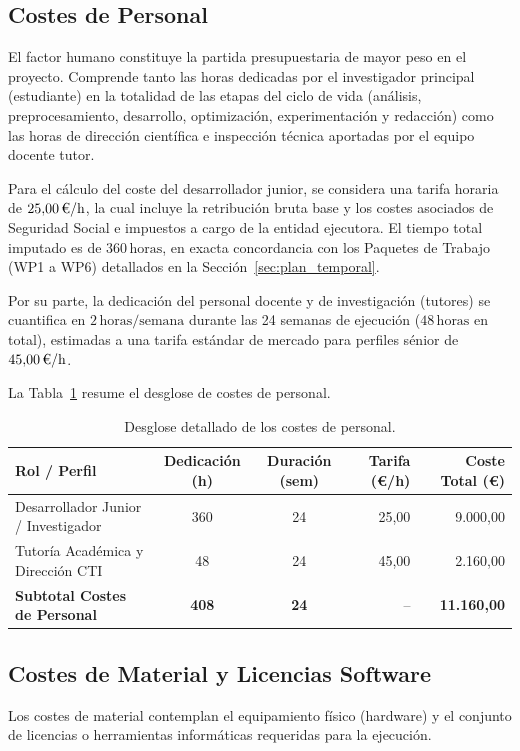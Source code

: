 \subsection{Costes de Personal}
El factor humano constituye la partida presupuestaria de mayor peso en el proyecto. Comprende tanto las horas dedicadas por el investigador principal (estudiante) en la totalidad de las etapas del ciclo de vida (análisis, preprocesamiento, desarrollo, optimización, experimentación y redacción) como las horas de dirección científica e inspección técnica aportadas por el equipo docente tutor.

Para el cálculo del coste del desarrollador junior, se considera una tarifa horaria de $25{,}00\,\text{\euro}/\text{h}$, la cual incluye la retribución bruta base y los costes asociados de Seguridad Social e impuestos a cargo de la entidad ejecutora. El tiempo total imputado es de $360\,\text{horas}$, en exacta concordancia con los Paquetes de Trabajo (WP1 a WP6) detallados en la Sección~\ref{sec:plan_temporal}.

Por su parte, la dedicación del personal docente y de investigación (tutores) se cuantifica en $2\,\text{horas/semana}$ durante las 24 semanas de ejecución ($48\,\text{horas}$ en total), estimadas a una tarifa estándar de mercado para perfiles sénior de $45{,}00\,\text{\euro}/\text{h}$.

La Tabla~\ref{tab:costes_personal} resume el desglose de costes de personal.

\begin{table}[htbp]
\centering
\caption{Desglose detallado de los costes de personal.}
\label{tab:costes_personal}
\small
\begin{tabularx}{\linewidth}{@{}Xccrr@{}}
\toprule
\textbf{Rol / Perfil} & \textbf{Dedicación (h)} & \textbf{Duración (sem)} & \textbf{Tarifa (\euro/h)} & \textbf{Coste Total (\euro)} \\
\midrule
Desarrollador Junior / Investigador & 360 & 24 & 25,00 & 9.000,00 \\
Tutoría Académica y Dirección CTI & 48 & 24 & 45,00 & 2.160,00 \\
\midrule
\textbf{Subtotal Costes de Personal} & \textbf{408} & \textbf{24} & -- & \textbf{11.160,00} \\
\bottomrule
\end{tabularx}
\end{table}

\subsection{Costes de Material y Licencias Software}
Los costes de material contemplan el equipamiento físico (hardware) y el conjunto de licencias o herramientas informáticas requeridas para la ejecución.

